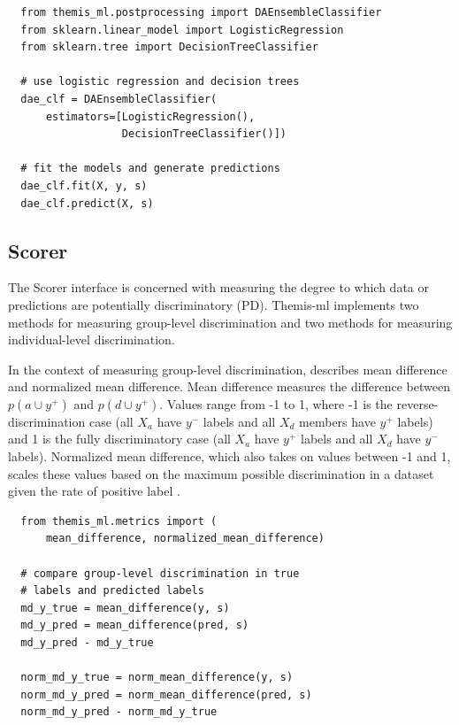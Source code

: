 \documentclass{acm_proc_article-sp}
\begin{document}
\begin{verbatim}
  from themis_ml.postprocessing import DAEnsembleClassifier
  from sklearn.linear_model import LogisticRegression
  from sklearn.tree import DecisionTreeClassifier

  # use logistic regression and decision trees
  dae_clf = DAEnsembleClassifier(
      estimators=[LogisticRegression(),
                  DecisionTreeClassifier()])

  # fit the models and generate predictions
  dae_clf.fit(X, y, s)
  dae_clf.predict(X, s)
\end{verbatim}

\subsection{Scorer}

The Scorer interface is concerned with measuring the degree to which data or
predictions are potentially discriminatory (PD). Themis-ml implements two
methods for measuring group-level discrimination and two methods for measuring
individual-level discrimination.

In the context of measuring group-level discrimination,
\cite{zliobaite2015survey} describes mean difference and normalized mean
difference. Mean difference measures the difference between \(p(a \cup y^{+})\)
and \(p(d \cup y^{+})\). Values range from -1 to 1, where -1 is the reverse-
discrimination case (all \(X_a\) have \(y^{-}\) labels and all \(X_d\) members
have \(y^{+}\) labels) and 1 is the fully discriminatory case (all \(X_a\) have
\(y^{+}\) labels and all \(X_d\) have \(y^{-}\) labels). Normalized mean
difference, which also takes on values between -1 and 1, scales these values
based on the maximum possible discrimination in a dataset given the rate of
positive label \cite{zliobaite2015survey}.

\begin{verbatim}
  from themis_ml.metrics import (
      mean_difference, normalized_mean_difference)

  # compare group-level discrimination in true
  # labels and predicted labels
  md_y_true = mean_difference(y, s)
  md_y_pred = mean_difference(pred, s)
  md_y_pred - md_y_true

  norm_md_y_true = norm_mean_difference(y, s)
  norm_md_y_pred = norm_mean_difference(pred, s)
  norm_md_y_pred - norm_md_y_true
\end{verbatim}
\end{document}

